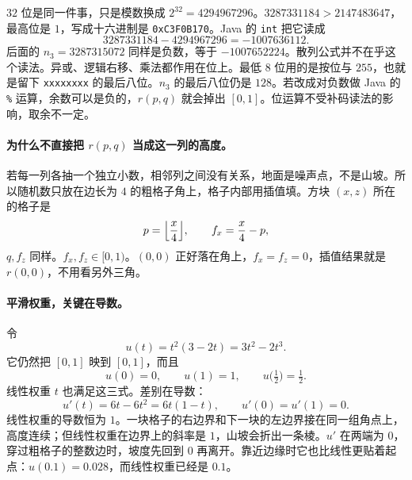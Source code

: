\documentclass[12pt,a4paper]{article}
\theoremstyle{definition}
\theoremstyle{plain}
\theoremstyle{remark}
\begin{document}
\(32\) 位是同一件事，只是模数换成 \(2^{32}=4294967296\)。\(3287331184>2147483647\)，最高位是 \(1\)，写成十六进制是 \texttt{0xC3F0B170}。Java 的 \texttt{int} 把它读成
\[
3287331184-4294967296=-1007636112.
\]
后面的 \(n_3=3287315072\) 同样是负数，等于 \(-1007652224\)。散列公式并不在乎这个读法。异或、逻辑右移、乘法都作用在位上。最低 \(8\) 位用的是按位与 \(255\)，也就是留下 \texttt{xxxxxxxx} 的最后八位。\(n_3\) 的最后八位仍是 \(128\)。若改成对负数做 Java 的 \texttt{\%} 运算，余数可以是负的，\(r(p,q)\) 就会掉出 \([0,1]\)。位运算不受补码读法的影响，取余不一定。

\paragraph{为什么不直接把 \(r(p,q)\) 当成这一列的高度。}
若每一列各抽一个独立小数，相邻列之间没有关系，地面是噪声点，不是山坡。所以随机数只放在边长为 \(4\) 的粗格子角上，格子内部用插值填。方块 \((x,z)\) 所在的格子是
\[
p=\Bigl\lfloor\frac{x}{4}\Bigr\rfloor,\qquad
f_x=\frac{x}{4}-p,
\]
\(q,f_z\) 同样。\(f_x,f_z\in[0,1)\)。\((0,0)\) 正好落在角上，\(f_x=f_z=0\)，插值结果就是 \(r(0,0)\)，不用看另外三角。

\paragraph{平滑权重，关键在导数。}
令
\[
u(t)=t^2(3-2t)=3t^2-2t^3.
\]
它仍然把 \([0,1]\) 映到 \([0,1]\)，而且
\[
u(0)=0,\qquad u(1)=1,\qquad u\bigl(\tfrac12\bigr)=\tfrac12.
\]
线性权重 \(t\) 也满足这三式。差别在导数：
\[
u'(t)=6t-6t^2=6t(1-t),\qquad u'(0)=u'(1)=0.
\]
线性权重的导数恒为 \(1\)。一块格子的右边界和下一块的左边界接在同一组角点上，高度连续；但线性权重在边界上的斜率是 \(1\)，山坡会折出一条棱。\(u'\) 在两端为 \(0\)，穿过粗格子的整数边时，坡度先回到 \(0\) 再离开。靠近边缘时它也比线性更贴着起点：\(u(0.1)=0.028\)，而线性权重已经是 \(0.1\)。
\end{document}
